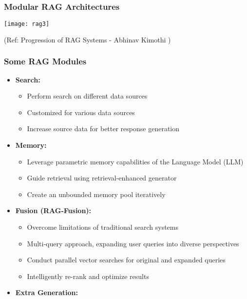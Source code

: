\begin{frame}[fragile]\frametitle{Modular RAG Architectures}

\begin{center}
\texttt{[image: rag3]}

{\tiny (Ref: Progression of RAG Systems - Abhinav Kimothi )}
\end{center}

\end{frame}

\begin{frame}[fragile]\frametitle{Some RAG Modules}

  \begin{itemize}
    \item \textbf{Search:}
          \begin{itemize}
              \item Perform search on different data sources
              \item Customized for various data sources
              \item Increase source data for better response generation
          \end{itemize}
    \item \textbf{Memory:}
          \begin{itemize}
              \item Leverage parametric memory capabilities of the Language Model (LLM)
              \item Guide retrieval using retrieval-enhanced generator
              \item Create an unbounded memory pool iteratively
          \end{itemize}
    \item \textbf{Fusion (RAG-Fusion):}
          \begin{itemize}
              \item Overcome limitations of traditional search systems
              \item Multi-query approach, expanding user queries into diverse perspectives
              \item Conduct parallel vector searches for original and expanded queries
              \item Intelligently re-rank and optimize results
          \end{itemize}
    \item \textbf{Extra Generation:}

\end{itemize}
\end{frame}
